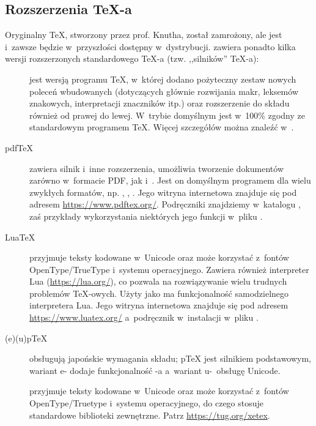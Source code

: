 \documentclass{article}
\begin{document}
\subsection{Rozszerzenia \protect\TeX-a}
\label{sec:tex-extensions}

Oryginalny \TeX{}, stworzony przez prof. Knutha, został zamrożony, ale jest
i~zawsze będzie w~przyszłości dostępny w~dystrybucji. \TL{} zawiera ponadto
kilka wersji rozszerzonych standardowego \TeX-a (tzw. ,,silników'' \TeX-a):

\begin{description}
\item [\eTeX] jest wersją \label{text:etex} programu \TeX{}, w~której dodano
 pożyteczny zestaw nowych poleceń wbudowanych
 (dotyczących głównie rozwijania makr, leksemów znakowych, interpretacji
 znaczników itp.) oraz rozszerzenie \TeXXeT{} do składu również
 od prawej do lewej. W~trybie domyślnym \eTeX{} jest w~100\% zgodny ze
 standardowym programem \TeX. Więcej szczegółów można znaleźć
 w~.

\item [pdf\TeX] zawiera silnik \eTeX{} i~inne
rozszerzenia, umożliwia tworzenie dokumentów zarówno w~formacie PDF, jak
i~\dvi{}. Jest on domyślnym programem dla wielu zwykłych formatów,
np. , , .
Jego witryna internetowa znajduje się pod adresem \url{https://www.pdftex.org/}.
Podręczniki znajdziemy w~katalogu ,
zaś przykłady wykorzystania niektórych jego funkcji
w~pliku .

\item[Lua\TeX] przyjmuje teksty kodowane w~Unicode oraz może korzystać
z~fontów OpenType\slash TrueType i~systemu operacyjnego. Zawiera również interpreter Lua
(\url{https://lua.org/}), co pozwala na rozwiązywanie wielu trudnych problemów \TeX-owych.
Użyty jako  ma funkcjonalność samodzielnego interpretera Lua.
Jego witryna internetowa znajduje się pod adresem \url{https://www.luatex.org/}
a~podręcznik w~instalacji w~pliku .

\item [(e)(u)p\TeX] obsługują japońskie wymagania składu; p\TeX{} jest
silnikiem podstawowym, wariant e- dodaje funkcjonalność \eTeX{}-a
a~wariant u-~obsługę Unicode.

\item [\XeTeX] przyjmuje teksty kodowane w~Unicode oraz może korzystać
z~fontów OpenType\slash Truetype i~systemu operacyjnego,
do czego stosuje standardowe biblioteki zewnętrzne. Patrz \url{https://tug.org/xetex}.


\end{description}
\end{document}
